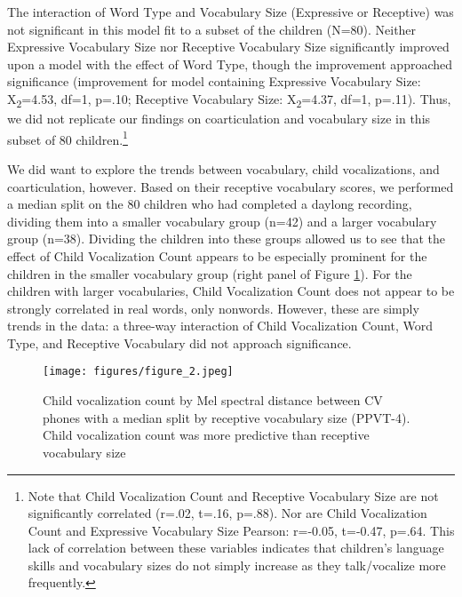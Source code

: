 \documentclass[a4paper,man,natbib,donotrepeattitle, apacite]{apa6}
\begin{document}
The interaction of Word Type and Vocabulary Size (Expressive or Receptive) was not significant in this model fit to a subset of the children (N=80). Neither Expressive Vocabulary Size nor Receptive Vocabulary Size significantly improved upon a model with the effect of Word Type, though the improvement approached significance (improvement for model containing Expressive Vocabulary Size: X\textsubscript{2}=4.53, df=1, p=.10; Receptive Vocabulary Size: X\textsubscript{2}=4.37, df=1, p=.11). Thus, we did not replicate our findings on coarticulation and vocabulary size in this subset of 80 children.\footnote{Note that Child Vocalization Count and Receptive Vocabulary Size are not significantly correlated (r=.02, t=.16, p=.88). Nor are Child Vocalization Count and Expressive Vocabulary Size Pearson: r=-0.05, t=-0.47, p=.64. This lack of correlation between these variables indicates that children’s language skills and vocabulary sizes do not simply increase as they talk/vocalize more frequently.} 

We did want to explore the trends between vocabulary, child vocalizations, and coarticulation, however. Based on their receptive vocabulary scores, we performed a median split on the 80 children who had completed a daylong recording, dividing them into a smaller vocabulary group (n=42) and a larger vocabulary group (n=38). Dividing the children into these groups allowed us to see that the effect of Child Vocalization Count appears to be especially prominent for the children in the smaller vocabulary group (right panel of Figure \ref{fig:figure-2}). For the children with larger vocabularies, Child Vocalization Count does not appear to be strongly correlated in real words, only nonwords. However, these are simply trends in the data: a three-way interaction of Child Vocalization Count, Word Type, and Receptive Vocabulary did not approach significance.


\begin{figure}[H]
\centering
\texttt{[image: figures/figure\_2.jpeg]}
\caption{\label{fig:figure-2}Child vocalization count by Mel spectral distance between CV phones with a median split by receptive vocabulary size (PPVT-4). Child vocalization count was more predictive than receptive vocabulary size}
\end{figure}
\end{document}
